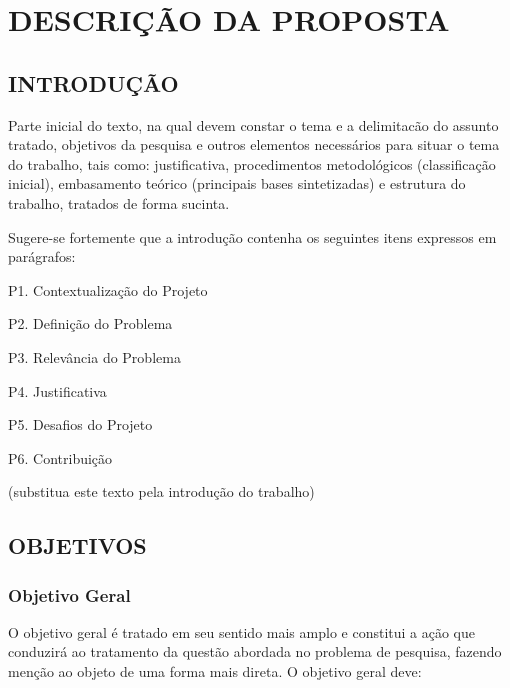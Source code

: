 
\chapter{DESCRIÇÃO DA PROPOSTA}
\label{chap:descricao}

\section{INTRODUÇÃO}
\label{sec:introducao}
Parte inicial do texto, na qual devem constar o tema e a delimitacão do assunto tratado, objetivos da pesquisa e outros elementos necessários para situar o tema do trabalho, tais como: justificativa, procedimentos metodológicos (classificação inicial), embasamento teórico (principais bases sintetizadas) e estrutura do trabalho, tratados de forma sucinta.

Sugere-se fortemente que a  introdução contenha os seguintes itens expressos em parágrafos:

P1. Contextualização do Projeto

P2. Definição do Problema

P3. Relevância do Problema

P4. Justificativa

P5. Desafios do Projeto

P6. Contribuição

(substitua este texto pela introdução do trabalho)

\section{OBJETIVOS}
\label{sec:objetivos}

\subsection{Objetivo Geral}
\label{subsec:objgeral}
O objetivo geral é tratado em seu sentido mais amplo e constitui a ação que conduzirá ao tratamento da questão abordada no problema de pesquisa, fazendo menção ao objeto de uma forma mais direta. O objetivo geral deve:

